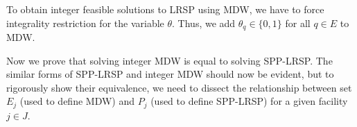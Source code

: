 
To obtain integer feasible solutions to LRSP using MDW, we have to force
integrality restriction for the variable $\theta$. Thus, we add  
$\theta_q \in \{0, 1\}$ for all $q \in E$ to MDW. 

Now we prove that solving integer MDW is equal to solving SPP-LRSP. 
The similar forms of SPP-LRSP and integer MDW should now be evident, but to
rigorously show their equivalence, we need to dissect the relationship
between set $E_j$ (used to define MDW) and $P_j$ (used to define SPP-LRSP)
for a given facility $j \in J$.


